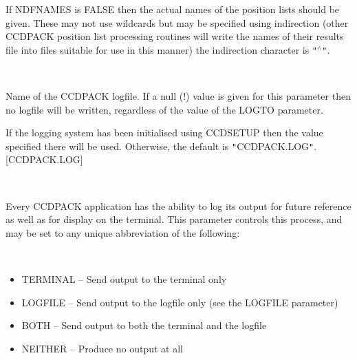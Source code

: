 \documentclass[twoside,11pt]{article}
\newcommand{\htmlref}[2]{#1}
\renewcommand{\_}{\texttt{\symbol{95}}}
\newcommand{\qt}[1]{{\tt "}#1{\tt "}}
\newcommand{\xroutine}[1]{\htmlref{{\sc #1}}{#1}}
\newcommand{\sstsubsection}[1]{ \item[{#1}] \mbox{} \\}
\newcommand{\sstitemlist}[1]{
  \mbox{} \\
  \vspace{-3.5ex}
  \begin{itemize}
     #1
  \end{itemize}
}
\newcommand{\sstitem}{\item}
\newcommand{\sstsubsection}[1]{\item[{#1}]}
\newcommand{\sstitemlist}[1]{
      \begin{itemize}
         #1
      \end{itemize}
      \\
   }
\newcommand{\sstitem}{\item}
\begin{document}
{{{         If NDFNAMES is FALSE then the actual names of the position
         lists should be given. These may not use wildcards but may be
         specified using indirection (other CCDPACK position list
         processing routines will write the names of their results file
         into files suitable for use in this manner) the indirection
         character is \qt{$^\wedge$}.
      }
      \sstsubsection{
         LOGFILE = FILENAME (Read)
      } {
         Name of the CCDPACK logfile.  If a null (!) value is given for
         this parameter then no logfile will be written, regardless of
         the value of the LOGTO parameter.

         If the logging system has been initialised using \xroutine{CCDSETUP}
         then the value specified there will be used. Otherwise, the
         default is \qt{CCDPACK.LOG}.
         [CCDPACK.LOG]
      }
      \sstsubsection{
         LOGTO = LITERAL (Read)
      } {
         Every CCDPACK application has the ability to log its output
         for future reference as well as for display on the terminal.
         This parameter controls this process, and may be set to any
         unique abbreviation of the following:
         \sstitemlist{

            \sstitem
               TERMINAL  -- Send output to the terminal only

            \sstitem
               LOGFILE   -- Send output to the logfile only (see the
                               LOGFILE parameter)

            \sstitem
               BOTH      -- Send output to both the terminal and the
                               logfile

            \sstitem
               NEITHER   -- Produce no output at all

}}}}
\end{document}

